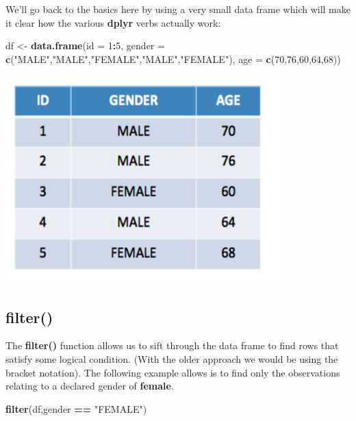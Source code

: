\documentclass[]{book}
\newenvironment{Shaded}{\begin{snugshade}}{\end{snugshade}}
\newcommand{\DataTypeTok}[1]{\textcolor[rgb]{0.13,0.29,0.53}{#1}}
\newcommand{\DecValTok}[1]{\textcolor[rgb]{0.00,0.00,0.81}{#1}}
\newcommand{\KeywordTok}[1]{\textcolor[rgb]{0.13,0.29,0.53}{\textbf{#1}}}
\newcommand{\NormalTok}[1]{#1}
\newcommand{\OperatorTok}[1]{\textcolor[rgb]{0.81,0.36,0.00}{\textbf{#1}}}
\newcommand{\StringTok}[1]{\textcolor[rgb]{0.31,0.60,0.02}{#1}}
\begin{document}
We'll go back to the basics here by using a very small data frame which will make it clear how the various \textbf{dplyr} verbs actually work:

\begin{Shaded}
\begin{Highlighting}[]
\NormalTok{df <-}\StringTok{ }\KeywordTok{data.frame}\NormalTok{(}\DataTypeTok{id =} \DecValTok{1}\OperatorTok{:}\DecValTok{5}\NormalTok{,}
                 \DataTypeTok{gender =} \KeywordTok{c}\NormalTok{(}\StringTok{"MALE"}\NormalTok{,}\StringTok{"MALE"}\NormalTok{,}\StringTok{"FEMALE"}\NormalTok{,}\StringTok{"MALE"}\NormalTok{,}\StringTok{"FEMALE"}\NormalTok{),}
                 \DataTypeTok{age =} \KeywordTok{c}\NormalTok{(}\DecValTok{70}\NormalTok{,}\DecValTok{76}\NormalTok{,}\DecValTok{60}\NormalTok{,}\DecValTok{64}\NormalTok{,}\DecValTok{68}\NormalTok{))}
\end{Highlighting}
\end{Shaded}

\includegraphics[width=4.16667in,height=\textheight]{./figures/df1.png}

\hypertarget{filter}{%
\subsection{filter()}\label{filter}}

The \textbf{filter()} function allows us to sift through the data frame to find rows that satisfy some logical condition. (With the older approach we would be using the bracket notation). The following example allows is to find only the observations relating to a declared gender of \textbf{female}.

\begin{Shaded}
\begin{Highlighting}[]
\KeywordTok{filter}\NormalTok{(df,gender }\OperatorTok{==}\StringTok{ "FEMALE"}\NormalTok{)}
\end{Highlighting}
\end{Shaded}
\end{document}
